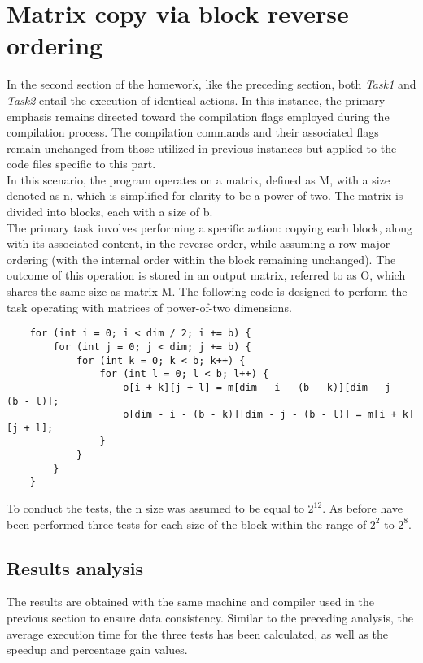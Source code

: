 \documentclass{article}
\begin{document}
\clearpage
\section{Matrix copy via block reverse ordering}
In the second section of the homework, like the preceding section, both \textit{Task1} and \textit{Task2} entail the execution of identical actions.%
In this instance, the primary emphasis remains directed toward the compilation flags employed during the compilation process. The compilation commands and their associated flags remain unchanged from those utilized in previous instances but applied to the code files specific to this part.\\
In this scenario, the program operates on a matrix, defined as M, with a size denoted as n, which is simplified for clarity to be a power of two. %
The matrix is divided into blocks, each with a size of b.\\
The primary task involves performing a specific action: copying each block, along with its associated content, in the reverse order, while assuming a row-major ordering (with the internal order within the block remaining unchanged). The outcome of this operation is stored in an output matrix, referred to as O, which shares the same size as matrix M.
The following code is designed to perform the task operating with matrices of power-of-two dimensions.

\begin{code}
    \begin{verbatim}
    for (int i = 0; i < dim / 2; i += b) {
        for (int j = 0; j < dim; j += b) {
            for (int k = 0; k < b; k++) {
                for (int l = 0; l < b; l++) {
                    o[i + k][j + l] = m[dim - i - (b - k)][dim - j - (b - l)];
                    o[dim - i - (b - k)][dim - j - (b - l)] = m[i + k][j + l];
                }
            }
        }
    }
    \end{verbatim}
\end{code}

To conduct the tests, the n size was assumed to be equal to $2^{12}$. As before have been performed three tests for each size of the block within the range of $2^2$ to $2^8$.
\subsection*{Results analysis}
The results are obtained with the same machine and compiler used in the previous section to ensure data consistency. %
Similar to the preceding analysis, the average execution time for the three tests has been calculated, as well as the speedup and %
percentage gain values.
\end{document}
